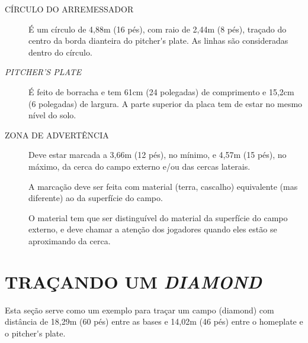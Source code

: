 \begin{description}
\item [CÍRCULO DO ARREMESSADOR] É um círculo de 4,88m (16 pés), com raio de 2,44m (8 pés), traçado do centro da borda dianteira do \gls{pitcher's plate}. As linhas são consideradas dentro do círculo.

\item [\textit{PITCHER'S PLATE}]
 É feito de borracha e tem 61cm (24 polegadas) de comprimento e 15,2cm (6 polegadas) de largura. A parte superior da placa tem de estar no mesmo nível do solo.

\item [ZONA DE ADVERTÊNCIA]
 Deve estar marcada a 3,66m (12 pés), no mínimo, e 4,57m (15 pés), no máximo, da cerca do campo externo e/ou das cercas laterais.

 A marcação deve ser feita com material (terra, cascalho) equivalente (mas diferente) ao da superfície do campo.

 O material tem que ser distinguível do material da superfície do campo externo, e deve chamar a atenção dos jogadores quando eles estão se aproximando da cerca.
\end{description}

\section{TRAÇANDO UM \textit{DIAMOND}}

Esta seção serve como um exemplo para traçar um campo (\gls{diamond}) com distância de 18,29m (60 pés) entre as bases e 14,02m (46 pés) entre o \gls{homeplate} e o \gls{pitcher's plate}.

